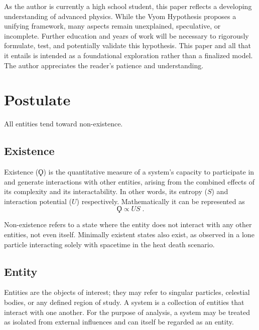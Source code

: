 \documentclass{article}
\begin{document}
As the author is currently a high school student, this paper reflects a developing understanding of advanced physics. 
While the Vyom Hypothesis proposes a unifying framework, many aspects remain unexplained, speculative, or incomplete. 
Further education and years of work will be necessary to rigorously formulate, test, and potentially validate this hypothesis. 
This paper and all that it entails is intended as a foundational exploration rather than a finalized model. 
The author appreciates the reader’s patience and understanding.



\newpage
\section{Postulate}


\vspace{0.4cm}
\begin{center}
All entities tend toward non-existence.
\end{center}


\subsection{Existence}

Existence ($\Koppa$) is the quantitative measure of a system’s capacity to participate in and generate interactions with other entities, arising from the combined effects of its complexity and its interactability. 
In other words, its entropy ($S$) and interaction potential ($U$) respectively. 
Mathematically it can be represented as
\[
    \Koppa \propto US\;.
\]

Non-existence refers to a state where the entity does not interact with any other entities, not even itself. Minimally existent states also exist, as observed in a lone particle interacting solely with spacetime in the heat death scenario.


\subsection{Entity}

Entities are the objects of interest; they may refer to singular particles, celestial bodies, or any defined region of study. 
A system is a collection of entities that interact with one another. 
For the purpose of analysis, a system may be treated as isolated from external influences and can itself be regarded as an entity.
\end{document}
